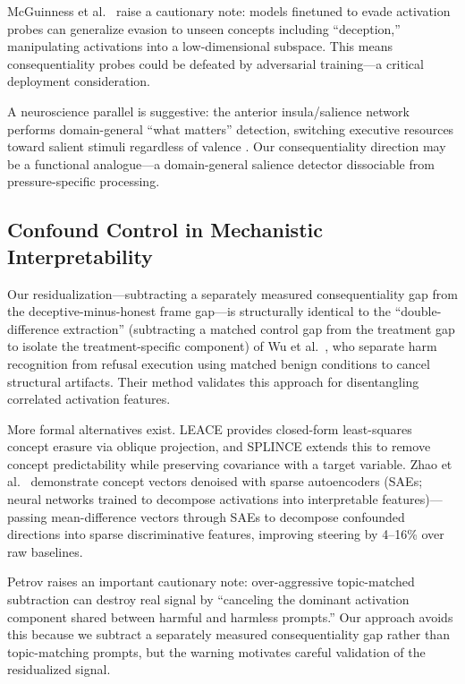 \documentclass[11pt,letterpaper]{article}
\begin{document}
McGuinness et al.\ \cite{mcguinness2025neural} raise a cautionary note: models finetuned to evade
activation probes can generalize evasion to unseen concepts including ``deception,'' manipulating
activations into a low-dimensional subspace. This means consequentiality probes could be defeated by
adversarial training---a critical deployment consideration.

A neuroscience parallel is suggestive: the anterior insula/salience network performs domain-general
``what matters'' detection, switching executive resources toward salient stimuli regardless of valence
\cite{menon2010saliency}. Our consequentiality direction may be a functional analogue---a
domain-general salience detector dissociable from pressure-specific processing.

\subsection{Confound Control in Mechanistic Interpretability}

Our residualization---subtracting a separately measured consequentiality gap from the deceptive-minus-honest
frame gap---is structurally identical to the ``double-difference extraction'' (subtracting a matched control gap from the treatment gap to isolate the treatment-specific component) of Wu et al.\
\cite{wu2026knowing}, who separate harm recognition from refusal execution using matched benign
conditions to cancel structural artifacts. Their method validates this approach for disentangling
correlated activation features.

More formal alternatives exist. LEACE \cite{belrose2023leace} provides closed-form least-squares
concept erasure via oblique projection, and SPLINCE \cite{holstege2025preserving} extends this to
remove concept predictability while preserving covariance with a target variable. Zhao et al.\
\cite{zhao2025denoising} demonstrate concept vectors denoised with sparse autoencoders
(SAEs; neural networks trained to decompose activations into interpretable features)---passing
mean-difference vectors through SAEs to decompose confounded directions into sparse discriminative features,
improving steering by 4--16\% over raw baselines.

Petrov \cite{petrov2026failure} raises an important cautionary note: over-aggressive topic-matched
subtraction can destroy real signal by ``canceling the dominant activation component shared between
harmful and harmless prompts.'' Our approach avoids this because we subtract a separately measured
consequentiality gap rather than topic-matching prompts, but the warning motivates careful validation
of the residualized signal.
\end{document}
